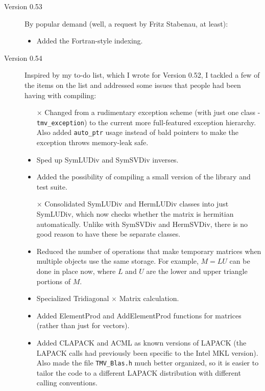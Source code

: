 \documentclass[twoside,letterpaper,11pt]{article}
\renewcommand{\tt}[1]{{\texttt {#1}}}
\begin{document}
\begin{description}
\item[Version 0.53]
By popular demand (well, a request by Fritz Stabenau, at least):
\begin{itemize}
\item
Added the Fortran-style indexing.
\end{itemize}

\item[Version 0.54]
Inspired by my to-do list, which I wrote for Version 0.52, I tackled a few of the 
items on the list and addressed some issues that people had been having
with compiling:
\begin{itemize}
\item[$\times$]
Changed from a rudimentary exception scheme (with just one class - 
\tt{tmv\_exception}) to the current more full-featured exception hierarchy.
Also added \tt{auto\_ptr} usage instead of bald pointers to make the 
exception throws memory-leak safe.
\item
Sped up SymLUDiv and SymSVDiv inverses.
\item
Added the possibility of compiling a small version of the library and test suite.
\item[$\times$]
Consolidated SymLUDiv and HermLUDiv classes into just SymLUDiv, which now checks
whether the matrix is hermitian automatically.  Unlike with SymSVDiv and
HermSVDiv, there is no good reason to have these be separate classes.
\item
Reduced the number of operations that make temporary matrices when multiple
objects use the same storage.  For example, $M = L U$ can be done in place now, where 
$L$ and $U$ are the lower and upper triangle portions of $M$.
\item
Specialized Tridiagonal $\times$ Matrix calculation.
\item
Added ElementProd and AddElementProd functions for matrices (rather than just
for vectors).
\item
Added CLAPACK and ACML as known versions of LAPACK (the LAPACK calls
had previously been specific to the Intel MKL version).  Also made the file
\tt{TMV\_Blas.h} much better organized, so it is easier to tailor the code to 
a different LAPACK distribution with different calling conventions.

\end{itemize}


\end{description}
\end{document}
